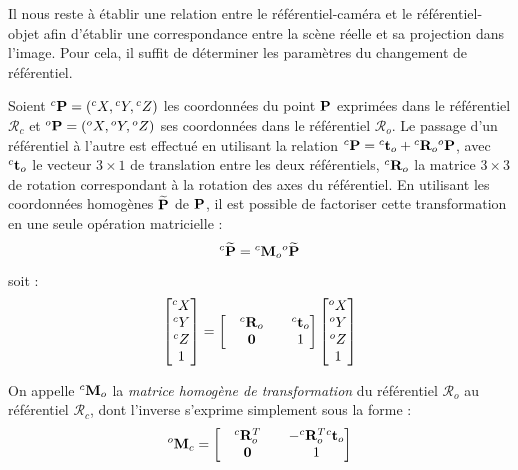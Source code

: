 Il nous reste à établir une relation entre le référentiel-caméra et le 
référentiel-objet afin d'établir une correspondance entre la scène réelle et sa 
projection dans l'image. Pour cela, il suffit de déterminer les paramètres du 
changement de référentiel.

Soient ${}^c{\bf P} = ({}^cX, {}^cY, {}^cZ)$ les coordonnées du point ${\bf P}$ 
exprimées dans le référentiel $\mathcal R_c$ et ${}^o{\bf P} = ({}^oX, {}^oY, 
{}^oZ)$ ses coordonnées dans le référentiel $\mathcal R_o$. Le passage d'un 
référentiel à l'autre est effectué en utilisant la relation ${}^c{\bf P} = 
{}^c{\bf t}_o + {}^c{\bf R}_o {}^o{\bf P}$, avec ${}^c{\bf t}_o$ le vecteur 
$3\times 1$ de translation entre les deux référentiels, ${}^c{\bf R}_o$ la 
matrice $3\times 3$ de rotation correspondant à la rotation des axes du 
référentiel. En utilisant les coordonnées homogènes $\widetilde {\bf P}$ de 
${\bf P}$, il est possible de factoriser cette transformation en une seule 
opération matricielle :
\begin{equation}
{}^c \widetilde {\bf P} = {}^c {\bf M}_o {}^o \widetilde {\bf P}
\label{intro:eq18}
\end{equation}
soit :
\begin{equation}
\begin{bmatrix}
{}^cX \\ {}^cY \\ {}^cZ \\ 1
\end{bmatrix}
=
\begin{bmatrix}
&  {}^c{\bf R}_o & & {}^c{\bf t}_o \\
& {\bf 0} & & 1
\end{bmatrix}
\begin{bmatrix}
{}^oX \\ {}^oY \\ {}^oZ \\ 1
\end{bmatrix}
\label{intro:eq19}
\end{equation}

On appelle ${}^c{\bf M}_o$ la {\it matrice homogène de transformation} du 
référentiel $\mathcal R_o$ au référentiel $\mathcal R_c$, dont l'inverse 
s'exprime simplement sous la forme :
\begin{equation}
{}^o{\bf M}_c = 
\begin{bmatrix}
&  {}^c{\bf R}_o^T & & -{}^c{\bf R}_o^T {}^c{\bf t}_o \\
& {\bf 0} & & 1
\end{bmatrix}
\label{intro:eq20}
\end{equation}

